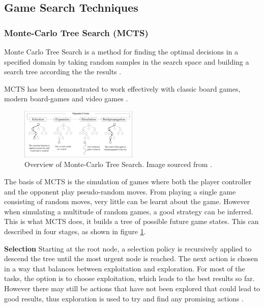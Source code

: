 \documentclass[journal]{IEEEtran}
\begin{document}

	
		
	
	\subsection{Game Search Techniques}
		
		\subsubsection{Monte-Carlo Tree Search (MCTS) }\label{sssec:MCTS}

		Monte Carlo Tree Search is a method for finding the optimal decisions in a specified domain by taking random samples in the search space and building a search tree according the the results \cite{browne2012survey}. 
		
		MCTS has been demonstrated to work effectively with classic board games, modern board-games and video games \cite{chaslot2008monte}.

		\begin{figure}[h]
		    \centering
		    \includegraphics[width=0.5\textwidth]{MCTSProcess}
		    \caption{Overview of Monte-Carlo Tree Search. Image sourced from \cite{chaslot2008monte}. }
		    \label{fig:MCTS1}
		\end{figure}
		

		The basis of MCTS is the simulation of games where both the player controller and the opponent play pseudo-random moves. From playing a single game consisting of random moves, very little can be learnt about the game. However when simulating a multitude of random games, a good strategy can be inferred. This is what MCTS does, it builds a tree of possible future game states. This can described in four stages, as shown in figure \ref{fig:MCTS1}.
		
		\textbf{Selection}
			Starting at the root node, a selection policy is recursively applied to descend the tree until the most urgent node is reached. 
			The next action is chosen in a way that balances between exploitation and exploration. For most of the tasks, the option is to choose exploitation, which leads to the best results so far. However there may still be actions that have not been explored that could lead to good results, thus exploration is used to try and find any promising actions \cite{chaslot2008monte}.
			
\end{document}
